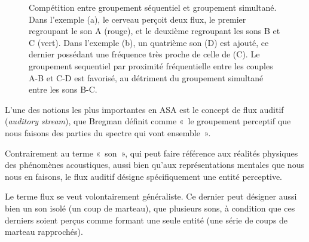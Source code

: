 \begin{figure}[t]
        \myfloatalign
        \caption[Compétition entre groupement séquentiel et groupement simultané.]{Compétition entre groupement séquentiel et groupement simultané. Dans l'exemple (a), le cerveau perçoit deux flux, le premier regroupant le son A (rouge), et le deuxième regroupant les sons B et C (vert). Dans l'exemple (b), un quatrième son (D) est ajouté, ce dernier possédant une fréquence très proche de celle de (C). Le groupement sequentiel par proximité fréquentielle entre les couples A-B et C-D est favorisé, au détriment du groupement simultané entre les sons B-C.}\label{fig:simvsseq}
\end{figure}

L'une des notions les plus importantes en ASA est le concept de flux auditif (\emph{auditory stream}), que Bregman définit comme «~le groupement perceptif que nous faisons des parties du spectre qui vont ensemble~».

Contrairement au terme «~son~», qui peut faire référence aux réalités physiques des phénomènes acoustiques, aussi bien qu'aux représentations mentales que nous nous en faisons, le flux auditif désigne spécifiquement une entité perceptive.

Le terme flux se veut volontairement généraliste. Ce dernier peut désigner aussi bien un son isolé (un coup de marteau), que plusieurs sons, à condition que ces derniers soient perçus comme formant une seule entité (une série de coups de marteau rapprochés).

